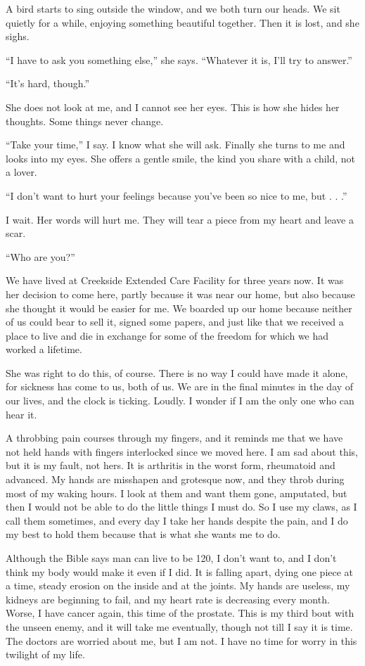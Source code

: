 \documentclass[10pt, twoside, openright]{book}
\begin{document}
A bird starts to sing outside the window, and we both turn our heads. We
sit quietly for a while, enjoying something beautiful together. Then it
is lost, and she sighs.

``I have to ask you something else,'' she says. ``Whatever it is, I'll
try to answer.''


``It's hard, though.''


She does not look at me, and I cannot see her eyes. This is how she
hides her thoughts. Some things never change.

``Take your time,'' I say. I know what she will ask. Finally she turns
to me and looks into my eyes. She offers a gentle smile, the kind you
share with a child, not a lover.

``I don't want to hurt your feelings because you've been so nice to me,
but . . .''

I wait. Her words will hurt me. They will tear a piece from my heart and
leave a scar.


``Who are you?''


We have lived at Creekside Extended Care Facility for three years now.
It was her decision to come here, partly because it was near our home,
but also because she thought it would be easier for me. We boarded up
our home because neither of us could bear to sell it, signed some
papers, and just like that we received a place to live and die in
exchange for some of the freedom for which we had worked a lifetime.

She was right to do this, of course. There is no way I could have made
it alone, for sickness has come to us, both of us. We are in the final
minutes in the day of our lives, and the clock is ticking. Loudly. I
wonder if I am the only one who can hear it.

A throbbing pain courses through my fingers, and it reminds me that we
have not held hands with fingers interlocked since we moved here. I am
sad about this, but it is my fault, not hers. It is arthritis in the
worst form, rheumatoid and advanced. My hands are misshapen and
grotesque now, and they throb during most of my waking hours. I look at
them and want them gone, amputated, but then I would not be able to do
the little things I must do. So I use my claws, as I call them
sometimes, and every day I take her hands despite the pain, and I do my
best to hold them because that is what she wants me to do.

Although the Bible says man can live to be 120, I don't want to, and I
don't think my body would make it even if I did. It is falling apart,
dying one piece at a time, steady erosion on the inside and at the
joints. My hands are useless, my kidneys are beginning to fail, and my
heart rate is decreasing every month. Worse, I have cancer again, this
time of the prostate. This is my third bout with the unseen enemy, and
it will take me eventually, though not till I say it is time. The
doctors are worried about me, but I am not. I have no time for worry in
this twilight of my life.
\end{document}
